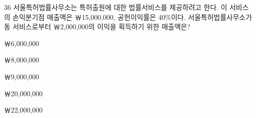 \begin{question}{36}
서울특허법률사무소는 특허출원에 대한 법률서비스를 제공하려고 한다. 이 서비스의 손익분기점 매출액은 ￦15,000,000, 공헌이익률은 40\%이다. 서울특허법률사무소가 동 서비스로부터 ￦2,000,000의 이익을 획득하기 위한 매출액은?
\begin{choices}
  \item ￦6,000,000
  \item ￦8,000,000
  \item ￦9,000,000
  \item ￦20,000,000
  \item ￦22,000,000
\end{choices}
\end{question}
